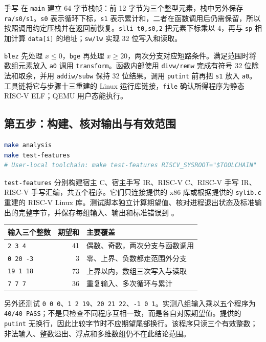 \documentclass[UTF8,a4paper,12pt]{ctexart}
\begin{document}
手写  在 \texttt{main} 建立 64 字节栈帧：前 12 字节为三个整型元素，栈中另外保存 \texttt{ra/s0/s1}。\texttt{s0} 表示循环下标，\texttt{s1} 表示累计和，二者在函数调用后仍需保留，所以按照调用约定压栈并在返回前恢复。\texttt{slli t0,s0,2} 把元素下标乘以 4，再与 \texttt{sp} 相加计算 \texttt{data[i]} 的地址；\texttt{sw/lw} 实现 32 位写入和读取。

\texttt{blez} 先处理 $x\leq0$，\texttt{bge} 再处理 $x\geq20$，两次分支对应短路条件。满足范围时将数组元素放入 \texttt{a0} 调用 \texttt{transform}。函数内部使用 \texttt{divw/remw} 完成有符号 32 位除法和取余，并用 \texttt{addiw/subw} 保持 32 位结果。调用 \texttt{putint} 前再把 \texttt{s1} 放入 \texttt{a0}。工具链将它与步骤十三重建的 Linux 运行库链接，\texttt{file} 确认所得程序为静态 RISC-V ELF；QEMU 用户态能执行。

\subsection{第五步：构建、核对输出与有效范围}

\begin{lstlisting}[language=bash]
make analysis
make test-features
# User-local toolchain: make test-features RISCV_SYSROOT="$TOOLCHAIN"
\end{lstlisting}

\texttt{test-features} 分别构建宿主 C、宿主手写 IR、RISC-V C、RISC-V 手写 IR、RISC-V 手写汇编，共五个程序。它们只连接提供的 x86 库或根据提供的 \texttt{sylib.c} 重建的 RISC-V Linux 库。测试脚本独立计算期望值、核对进程退出状态及标准输出的完整字节，并保存每组输入、输出和标准错误到 。

\begin{center}
\begin{tabular}{p{4cm}rp{7cm}}
\toprule
输入三个整数 & 期望和 & 主要覆盖 \\
\midrule
\texttt{2 3 4} & 41 & 偶数、奇数，两次分支与函数调用 \\
\texttt{0 20 -3} & 3 & 零、上界、负数都走范围外分支 \\
\texttt{19 1 18} & 73 & 上界以内，数组三次写入与读取 \\
\texttt{7 7 7} & 36 & 重复输入、多次循环与累计 \\
\bottomrule
\end{tabular}
\end{center}

另外还测试 \texttt{0 0 0}、\texttt{1 2 19}、\texttt{20 21 22}、\texttt{-1 0 1}。实测八组输入乘以五个程序为 \texttt{40/40 PASS}；不是只检查不同程序互相一致，而是各自对照期望值。提供的 \texttt{putint} 无换行，因此比较字节时不应期望尾部换行。该程序只读三个有效整数；非法输入、整数溢出、浮点和多维数组仍不在此结论范围。
\end{document}
